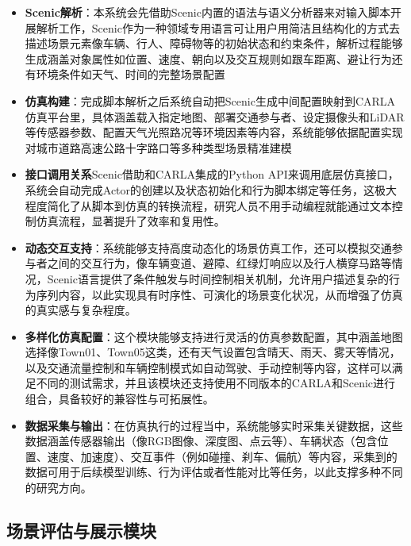 \begin{itemize}
	\item \textbf{Scenic解析}：本系统会先借助Scenic内置的语法与语义分析器来对输入脚本开展解析工作，Scenic作为一种领域专用语言可让用户用简洁且结构化的方式去描述场景元素像车辆、行人、障碍物等的初始状态和约束条件，解析过程能够生成涵盖对象属性如位置、速度、朝向以及交互规则如跟车距离、避让行为还有环境条件如天气、时间的完整场景配置
	
	\item \textbf{仿真构建}：完成脚本解析之后系统自动把Scenic生成中间配置映射到CARLA仿真平台里，具体涵盖载入指定地图、部署交通参与者、设定摄像头和LiDAR等传感器参数、配置天气光照路况等环境因素等内容，系统能够依据配置实现对城市道路高速公路十字路口等多种类型场景精准建模
	\item \textbf{接口调用关系}Scenic借助和CARLA集成的Python API来调用底层仿真接口，系统会自动完成Actor的创建以及状态初始化和行为脚本绑定等任务，这极大程度简化了从脚本到仿真的转换流程，研究人员不用手动编程就能通过文本控制仿真流程，显著提升了效率和复用性。
	
	\item \textbf{动态交互支持}：系统能够支持高度动态化的场景仿真工作，还可以模拟交通参与者之间的交互行为，像车辆变道、避障、红绿灯响应以及行人横穿马路等情况，Scenic语言提供了条件触发与时间控制相关机制，允许用户描述复杂的行为序列内容，以此实现具有时序性、可演化的场景变化状况，从而增强了仿真的真实感与复杂程度。
	
	\item \textbf{多样化仿真配置}：这个模块能够支持进行灵活的仿真参数配置，其中涵盖地图选择像Town01、Town05这类，还有天气设置包含晴天、雨天、雾天等情况，以及交通流量控制和车辆控制模式如自动驾驶、手动控制等内容，这样可以满足不同的测试需求，并且该模块还支持使用不同版本的CARLA和Scenic进行组合，具备较好的兼容性与可拓展性。
	
	\item \textbf{数据采集与输出}：在仿真执行的过程当中，系统能够实时采集关键数据，这些数据涵盖传感器输出（像RGB图像、深度图、点云等）、车辆状态（包含位置、速度、加速度）、交互事件（例如碰撞、刹车、偏航）等内容，采集到的数据可用于后续模型训练、行为评估或者性能对比等任务，以此支撑多种不同的研究方向。
	
\end{itemize}


\subsection{场景评估与展示模块}

